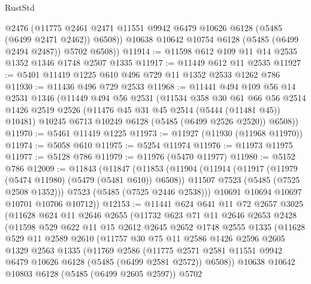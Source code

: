 \begin{lexlean}{RustStd}
\begin{coremodule}
          @2476
          (@11775 @2461 @2471 @11551 @9942 @6479 @10626 @6128 (@5485 (@6499 @2471 @2462)) @6508))
        @10638
        @10642
        @10754
        @6128
        (@5485 (@6499 @2494 @2487))
        @5702
        @6508))
@11914 := @11598 @612 @109 @11 @14 @2535 @1352 @1346 @1748 @2507 @1335
@11917 := @11449 @612 @11 @2535
@11927 := @5401 @11419 @1225 @610 @496 @729 @11 @1352 @2533 @1262 @786
@11930 := @11436 @496 @729 @2533
@11968 := @11441
    @494
    @109
    @56
    @14
    @2531
    @1346
    (@11449
      @494
      @56
      @2531
      (@11534
        @358
        @30
        @61
        @66
        @56
        @2514
        @1426
        @2519
        @2526
        (@11476 @45 @31 @45 @2514 (@5444 (@11481 @45)) @10481)
        @10245
        @6713
        @10249
        @6128
        (@5485 (@6499 @2526 @2520))
        @6508))
@11970 := @5461 @11419 @1225
@11973 := @11927 (@11930 (@11968 @11970))
@11974 := @5058 @610
@11975 := @5254 @11974
@11976 := @11973 @11975
@11977 := @5128 @786
@11979 := @11976 (@5470 @11977)
@11980 := @5152 @786
@12009 := @11843
    (@11847
      (@11853
        (@11904
          (@11914
            (@11917 (@11979 (@5474 @11980) (@5479 (@5481 @610)) @6508))
            @11507
            @7523
            (@5485 (@7525 @2508 @1352)))
          @7523
          (@5485 (@7525 @2446 @2538)))
        @10691
        @10694
        @10697
        @10701
        @10706
        @10712))
@12153 := @11441
    @624
    @641
    @11
    @72
    @2657
    @3025
    (@11628
      @624
      @11
      @2646
      @2655
      (@11732
        @623
        @71
        @11
        @2646
        @2653
        @2428
        (@11598
          @529
          @622
          @11
          @15
          @2612
          @2645
          @2652
          @1748
          @2555
          @1335
          (@11628
            @529
            @11
            @2589
            @2610
            (@11757
              @30
              @75
              @11
              @2586
              @1426
              @2596
              @2605
              @1329
              @2563
              @1335
              (@11769
                @2586
                (@11775
                  @2571
                  @2581
                  @11551
                  @9942
                  @6479
                  @10626
                  @6128
                  (@5485 (@6499 @2581 @2572))
                  @6508))
              @10638
              @10642
              @10803
              @6128
              (@5485 (@6499 @2605 @2597))
              @5702

\end{coremodule}
\end{lexlean}
